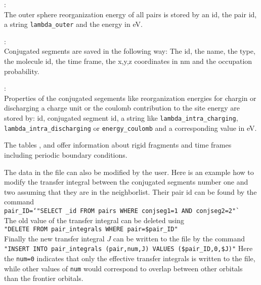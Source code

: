 \sqlpairproperties:\\
The outer sphere reorganization energy of all pairs is stored by an id, the pair id, a string \texttt{lambda\_outer} and the energy in eV.

\sqlconjsegs:\\
Conjugated segments are saved in the following way: The id, the name, the type, the molecule id, the time frame, the x,y,z coordinates in nm and the occupation probability.

\sqlconjsegproperties:\\
Properties of the conjugated segements like reorganization energies for chargin or discharging a charge unit or the coulomb contribution to the site energy are stored by: id, conjugated segment id, a string like \texttt{lambda\_intra\_charging}, \texttt{lambda\_intra\_discharging} or \texttt{energy\_coulomb} and a corresponding value in eV.

The tables \sqlrigidfragproperties, \sqlrigidfrags and \sqlframes offer information about rigid fragments and time frames including periodic boundary conditions.


The data in the \sqlstate file can also be modified by the user. Here is an example how to modify the transfer integral between the conjugated segments number one and two assuming that they are in the neighborlist.
Their pair id can be found by the command \\ 
{\small \texttt{pair\_ID=`}\sqlite \sqlstate \texttt{"SELECT \_id FROM pairs WHERE conjseg1=1 AND conjseg2=2"`}} \\
The old value of the transfer integral can be deleted using\\
{\small \sqlite \sqlstate \texttt{"DELETE FROM pair\_integrals WHERE pair=\$pair\_ID"}}\\
Finally the new transfer integral $J$ can be written to the \sqlstate file by the command\\
{\small \sqlite \sqlstate \texttt{"INSERT INTO pair\_integrals (pair,num,J) VALUES (\$pair\_ID,0,\$J)"}}
Here the \texttt{num=0} indicates that only the effective transfer integrals is written to the file, while other values of \texttt{num}
would correspond to overlap between other orbitals than the frontier orbitals.

